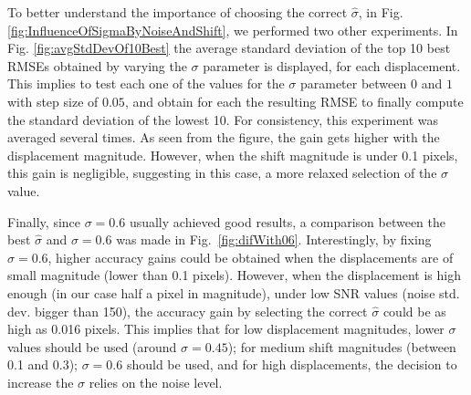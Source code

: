 To better understand the importance of choosing the correct $\hat{\sigma}$, in Fig. \ref{fig:InfluenceOfSigmaByNoiseAndShift}, we performed two other experiments. In Fig. \ref{fig:avgStdDevOf10Best} the average standard deviation of the top 10 best RMSEs obtained by varying the $\sigma$ parameter is displayed, for each displacement. This implies to test each one of the values for the $\sigma$ parameter between $0$ and $1$ with step size of $0.05$, and obtain for each the resulting RMSE to finally compute the standard deviation of the lowest 10. For consistency, this experiment was averaged several times. As seen from the figure, the gain gets higher with the displacement magnitude. However, when the shift magnitude is under 0.1 pixels, this gain is negligible, suggesting in this case, a more relaxed selection of the $\sigma$ value.


Finally, since $\sigma=0.6$ usually achieved good results, a comparison between the best $\hat{\sigma}$ and $\sigma=0.6$ was made in Fig.~\ref{fig:difWith06}. Interestingly, by fixing $\sigma=0.6$, higher accuracy gains could be obtained when the displacements are of small magnitude (lower than 0.1 pixels). However, when the displacement is high enough (in our case half a pixel in magnitude), under low SNR values (noise std. dev. bigger than 150), the accuracy gain by selecting the correct $\hat{\sigma}$ could be as high as 0.016 pixels. This implies that for low displacement magnitudes, lower $\sigma$ values should be used (around $\sigma=0.45$); for medium shift magnitudes (between 0.1 and 0.3); $\sigma=0.6$ should be used, and for high displacements, the decision to increase the $\sigma$ relies on the noise level.


